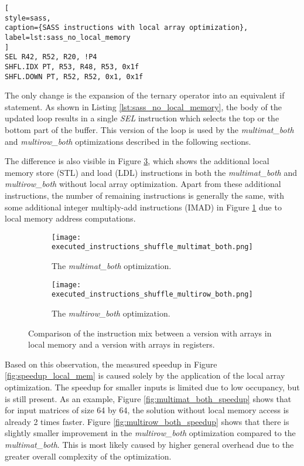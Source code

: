 \begin{lstlisting}[
style=sass,
caption={SASS instructions with local array optimization},
label=lst:sass_no_local_memory
]
SEL R42, R52, R20, !P4
SHFL.IDX PT, R53, R48, R53, 0x1f
SHFL.DOWN PT, R52, R52, 0x1, 0x1f
\end{lstlisting}

The only change is the expansion of the ternary operator into an equivalent if statement. As shown in Listing \ref{lst:sass_no_local_memory}, the body of the updated loop results in a single \textit{SEL} instruction which selects the top or the bottom part of the buffer. This version of the loop is used by the \textit{multimat\_both} and \textit{multirow\_both} optimizations described in the following sections.

The difference is also visible in Figure \ref{fig:instruction_mix_local_mem}, which shows the additional local memory store (STL) and load (LDL) instructions in both the \textit{multimat\_both} and \textit{multirow\_both} without local array optimization. Apart from these additional instructions, the number of remaining instructions is generally the same, with some additional integer multiply-add instructions (IMAD) in Figure \ref{fig:local_mem_multimat_both_instruction_mix} due to local memory address computations.

\begin{figure}[ht]
	\centering	
	\begin{subfigure}{\textwidth}
		\centering
		\texttt{[image: executed\_instructions\_shuffle\_multimat\_both.png]}
		\caption{The \textit{multimat\_both} optimization.}
		\label{fig:local_mem_multimat_both_instruction_mix}
	\end{subfigure}
	\hfill
	\begin{subfigure}{\textwidth}
		\centering
		\texttt{[image: executed\_instructions\_shuffle\_multirow\_both.png]}
		\caption{The \textit{multirow\_both} optimization.}
		\label{fig:local_mem_multirow_both_instruction_mix}
	\end{subfigure}
	
	\caption{Comparison of the instruction mix between a version with arrays in local memory and a version with arrays in registers.}
	\label{fig:instruction_mix_local_mem}
\end{figure}

Based on this observation, the measured speedup in Figure \ref{fig:speedup_local_mem} is caused solely by the application of the local array optimization. The speedup for smaller inputs is limited due to low occupancy, but is still present. As an example, Figure \ref{fig:multimat_both_speedup} shows that for input matrices of size 64 by 64, the solution without local memory access is already 2 times faster. Figure \ref{fig:multirow_both_speedup} shows that there is slightly smaller improvement in the \textit{multirow\_both} optimization compared to the \textit{multimat\_both}. This is most likely caused by higher general overhead due to the greater overall complexity of the optimization.


